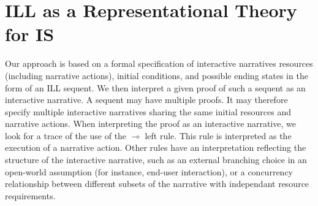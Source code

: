\documentclass[runningheads,a4paper]{llncs}
\begin{document}
\section{ILL as a Representational Theory for IS}
%
Our approach is based on a formal specification of interactive narratives resources (including narrative actions), initial conditions, and possible ending states in the form of an ILL sequent. We then interpret a given proof of such a sequent as an interactive narrative. A sequent may have multiple proofs. It may therefore specify multiple interactive narratives sharing the same initial resources and narrative actions. When interpreting the proof as an interactive narrative, we look for a trace of the use of the $\multimap$ left rule. This rule is interpreted as the execution of a narrative action. Other rules have an interpretation reflecting the structure of the interactive narrative, such as an external branching choice in an open-world assumption (for instance, end-user interaction), or a concurrency relationship between different subsets of the narrative with independant resource requirements. 
\end{document}
